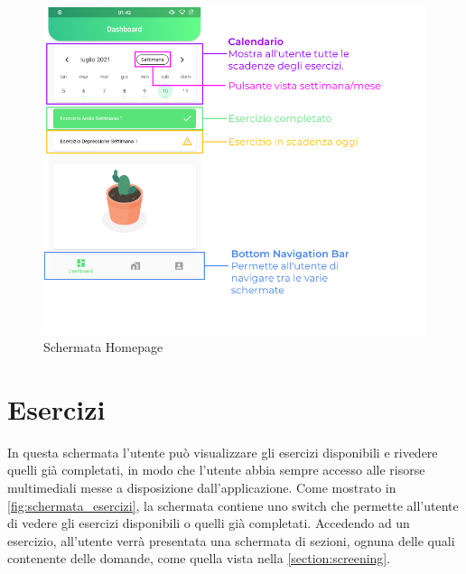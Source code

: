 \begin{figure}[h!]
\centering
\includegraphics[width=\textwidth]{img/homepage}
\caption{Schermata Homepage}
\label{fig:homepage}
\end{figure}

\newpage
\section{Esercizi}
In questa schermata l'utente può visualizzare gli esercizi disponibili e rivedere quelli già completati, in modo che l'utente abbia sempre accesso alle risorse multimediali messe a disposizione dall'applicazione. Come mostrato in \autoref{fig:schermata_esercizi}, la schermata contiene uno switch che permette all'utente di vedere gli esercizi disponibili o quelli già completati. Accedendo ad un esercizio, all'utente verrà presentata una schermata di sezioni, ognuna delle quali contenente delle domande, come quella vista nella \autoref{section:screening}.

